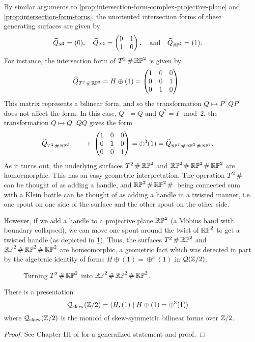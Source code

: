 By similar arguments to \cref{prop:intersection-form-complex-projective-plane} and \cref{prop:intersection-form-torus}, the unoriented intersection forms of these generating surfaces are given by
\[
	\widetilde{Q}_{S^2}=(0),\quad \widetilde{Q}_{T^2}=\begin{pmatrix}0 & 1 \\ 1 & 0\end{pmatrix},\quad \textrm{and}\quad\widetilde{Q}_{\mathbb{RP}^2} = (1).
\]
For instance, the intersection form of $T^2\,\#\, \mathbb{RP}^2$ is given by
\[
	\widetilde{Q}_{T^2\,\#\, \mathbb{RP}^2} = H\oplus (1)=
	\begin{pmatrix}
		1 & 0 & 0 \\
		0 & 0 & 1 \\
		0 & 1 & 0
	\end{pmatrix}.
\]
This matrix represents a bilinear form, and so the transformation $Q\mapsto P^\intercal Q P$ does not affect the form. In this case, $Q^\intercal =Q$ and $Q^2=I\mod 2$, the transformation $Q\mapsto Q^\intercal Q Q$ gives the form
\[
	\widetilde{Q}_{T^2\+ \RP^2}
	\lkxto \begin{pmatrix}
		1 & 0 & 0 \\
		0 & 1 & 0 \\
		0 & 0 & 1
	\end{pmatrix} =\oplus^3(1)= \widetilde{Q}_{\RP^2\+\RP^2\+\RP^2}.
\]
As it turns out, the underlying surfaces $T^2\,\#\,\mathbb{RP}^2$ and $\mathbb{RP}^2\,\#\,\mathbb{RP}^2\,\#\,\mathbb{RP}^2$ are homoemorphic. This has an easy geometric interpretation. The operation $T^2\,\#\,$ can be thought of as adding a handle, and $\mathbb{RP}^2\,\#\,\mathbb{RP}^2\,\#\,$ being connected sum with a Klein bottle can be thought of as adding a handle in a twisted manner, i.e. one spout on one side of the surface and the other spout on the other side.

However, if we add a handle to a projective plane $\mathbb{RP}^2$ (a M\"obius band with boundary collapsed), we can move one spout around the twist of $\mathbb{RP}^2$ to get a twisted handle (as depicted in \cref{fig:twisted-handle-to-handle}). Thus, the surfaces $T^2\,\#\,\mathbb{RP}^2$ and $\mathbb{RP}^2\,\#\,\mathbb{RP}^2\,\#\,\mathbb{RP}^2$ are homeomorphic, a geometric fact which was detected in part by the algebraic identity of forms $H\oplus (1)=\oplus^3(1)$ in $\mathcal{Q}(\mathbb{Z}/2)$.

\begin{figure}
	\centering
	\medskip
	\caption{Turning $T^2\,\#\,\mathbb{RP}^2$ into $\mathbb{RP}^2\,\#\,\mathbb{RP}^2\,\#\,\mathbb{RP}^2$.}\label{fig:twisted-handle-to-handle}
\end{figure}

\begin{proposition}
	There is a presentation
	\[\mathcal{Q}_{\mathrm{skew}}(\mathbb{Z}/2) = \langle H, (1) \mid H\oplus (1) = \oplus^3 (1)\rangle\]
	where $\mathcal{Q}_{\mathrm{skew}}(\mathbb{Z}/2)$ is the monoid of skew-symmetric bilinear forms over $\mathbb{Z}/2$.
\end{proposition}
\begin{proof}
	See Chapter III of \cite{milnorhuse1973forms} for a generalized statement and proof.
\end{proof}

